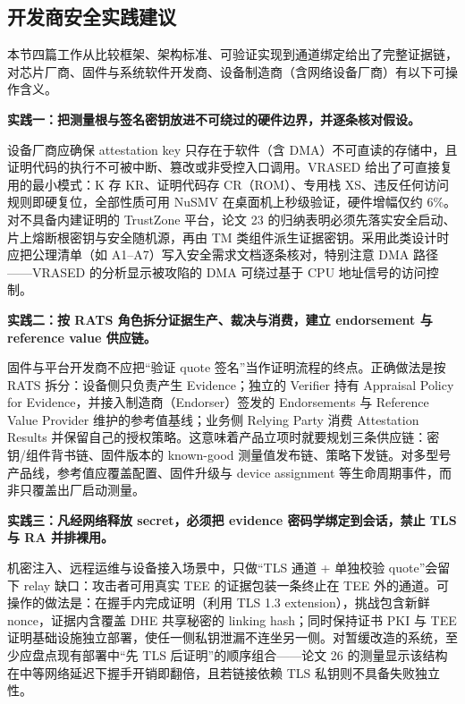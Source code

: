 \documentclass[11pt]{ctexart}
\begin{document}
\subsection{开发商安全实践建议}
本节四篇工作从比较框架、架构标准、可验证实现到通道绑定给出了完整证据链，对芯片厂商、固件与系统软件开发商、设备制造商（含网络设备厂商）有以下可操作含义。\par
\noindent\textbf{实践一：把测量根与签名密钥放进不可绕过的硬件边界，并逐条核对假设。}\par
设备厂商应确保 attestation key 只存在于软件（含 DMA）不可直读的存储中，且证明代码的执行不可被中断、篡改或非受控入口调用。VRASED 给出了可直接复用的最小模式：K 存 KR、证明代码存 CR（ROM）、专用栈 XS、违反任何访问规则即硬复位，全部性质可用 NuSMV 在桌面机上秒级验证，硬件增幅仅约 6\%\cite{nunes2019vrased}。对不具备内建证明的 TrustZone 平台，论文 23 的归纳表明必须先落实安全启动、片上熔断根密钥与安全随机源，再由 TM 类组件派生证据密钥\cite{menetrey2022attestation}。采用此类设计时应把公理清单（如 A1–A7）写入安全需求文档逐条核对，特别注意 DMA 路径——VRASED 的分析显示被攻陷的 DMA 可绕过基于 CPU 地址信号的访问控制。\par
\noindent\textbf{实践二：按 RATS 角色拆分证据生产、裁决与消费，建立 endorsement 与 reference value 供应链。}\par
固件与平台开发商不应把“验证 quote 签名”当作证明流程的终点。正确做法是按 RATS 拆分：设备侧只负责产生 Evidence；独立的 Verifier 持有 Appraisal Policy for Evidence，并接入制造商（Endorser）签发的 Endorsements 与 Reference Value Provider 维护的参考值基线；业务侧 Relying Party 消费 Attestation Results 并保留自己的授权策略\cite{rats_rfc}。这意味着产品立项时就要规划三条供应链：密钥/组件背书链、固件版本的 known-good 测量值发布链、策略下发链。对多型号产品线，参考值应覆盖配置、固件升级与 device assignment 等生命周期事件，而非只覆盖出厂启动测量。\par
\noindent\textbf{实践三：凡经网络释放 secret，必须把 evidence 密码学绑定到会话，禁止 TLS 与 RA 并排裸用。}\par
机密注入、远程运维与设备接入场景中，只做“TLS 通道 + 单独校验 quote”会留下 relay 缺口：攻击者可用真实 TEE 的证据包装一条终止在 TEE 外的通道\cite{weinhold2025tlsra}。可操作的做法是：在握手内完成证明（利用 TLS 1.3 extension），挑战包含新鲜 nonce，证据内含覆盖 DHE 共享秘密的 linking hash；同时保持证书 PKI 与 TEE 证明基础设施独立部署，使任一侧私钥泄漏不连坐另一侧。对暂缓改造的系统，至少应盘点现有部署中“先 TLS 后证明”的顺序组合——论文 26 的测量显示该结构在中等网络延迟下握手开销即翻倍，且若链接依赖 TLS 私钥则不具备失败独立性。\par
\end{document}
